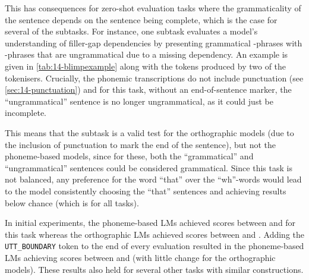 This has consequences for zero-shot evaluation tasks where the grammaticality of the sentence depends on the sentence being complete, which is the case for several of the \blimp subtasks. For instance, one subtask evaluates a model's understanding of filler-gap dependencies by presenting grammatical -phrases with -phrases that are ungrammatical due to a missing dependency. An example is given in \cref{tab:14-blimpexample} along with the tokens produced by two of the tokenisers. Crucially, the phonemic transcriptions do not include punctuation (see \cref{sec:14-punctuation}) and for this task, without an end-of-sentence marker, the ``ungrammatical'' sentence is no longer ungrammatical, as it could just be incomplete.

This means that the subtask is a valid test for the orthographic models (due to the inclusion of punctuation to mark the end of the sentence), but not the phoneme-based models, since for these, both the ``grammatical'' and ``ungrammatical'' sentences could be considered grammatical. Since this task is not balanced, any preference for the word ``that'' over the ``wh''-words would lead to the model consistently choosing the ``that'' sentences and achieving results below chance (which is  for all \blimp tasks).


In initial experiments, the phoneme-based LMs achieved scores between  and  for this task whereas the orthographic LMs achieved scores between  and . Adding the \texttt{UTT\_BOUNDARY} token to the end of every evaluation resulted in the phoneme-based LMs achieving scores between  and  (with little change for the orthographic models). These results also held for several other \blimp tasks with similar constructions. 

